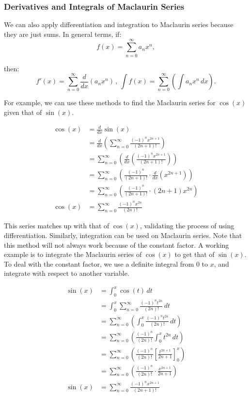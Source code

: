 \documentclass[12pt]{article}
\begin{document}
\subsubsection{Derivatives and Integrals of Maclaurin Series}

We can also apply differentiation and integration to Maclaurin series because they are just sums. In general terms, if:
\[ f(x) = \sum_{n=0}^{\infty} a_n x^n, \]

\noindent then:
\[ f'(x) = \sum_{n=0}^{\infty} \frac{d}{dx} \left( a_n x^n \right) \, , \, \int f(x) = \sum_{n=0}^{\infty} \left( \int a_n x^n \, dx \right). \]

For example, we can use these methods to find the Maclaurin series for $\cos(x)$ given that of $\sin(x)$.

\begin{align*}
    \cos(x) &= \frac{d}{dx} \sin(x) \\[6pt]
    &= \frac{d}{dx} \left( \sum_{n=0}^\infty \frac{(-1)^n x^{2n+1}}{(2n+1)!} \right) \\[6pt]
    &= \sum_{n=0}^\infty \left( \frac{d}{dx} \left( \frac{(-1)^n x^{2n+1}}{(2n+1)!} \right) \right) \\[6pt]
    &= \sum_{n=0}^\infty \left( \frac{(-1)^n}{(2n+1)!} \cdot \frac{d}{dx} (x^{2n+1}) \right) \\[6pt]
    &= \sum_{n=0}^\infty \left( \frac{(-1)^n}{(2n+1)!} \cdot (2n+1) x^{2n} \right) \\[6pt]
    \cos(x) &= \sum_{n=0}^\infty \frac{(-1)^n x^{2n}}{(2n)!}
\end{align*}

This series matches up with that of $\cos(x)$, validating the process of using differentiation. Similarly, integration can be used on Maclaurin series. Note that this method will not always work because of the constant factor. A working example is to integrate the Maclaurin series of $\cos(x)$ to get that of $\sin(x)$. To deal with the constant factor, we use a definite integral from $0$ to $x$, and integrate with respect to another variable.

\begin{align*}
    \sin(x) &= \int_0^x \cos(t) \, dt \\
    &= \int_0^x \sum_{n=0}^\infty \frac{(-1)^n t^{2n}}{(2n)!} \, dt \\[6pt]
    &= \sum_{n=0}^\infty \left( \int_0^x \frac{(-1)^n t^{2n}}{(2n)!} \, dt \right) \\[6pt]
    &= \sum_{n=0}^\infty \left( \frac{(-1)^n}{(2n)!} \int_0^x t^{2n} \, dt \right) \\[6pt]
    &= \sum_{n=0}^\infty \left( \frac{(-1)^n}{(2n)!} \left[ \frac{t^{2n+1}}{2n+1} \right]_0^x \right) \\[6pt]
    &= \sum_{n=0}^\infty \left( \frac{(-1)^n}{(2n)!} \cdot \frac{x^{2n+1}}{2n+1} \right) \\[6pt]
    \sin(x) &= \sum_{n=0}^\infty \frac{(-1)^n x^{2n+1}}{(2n+1)!}
\end{align*}
\end{document}
